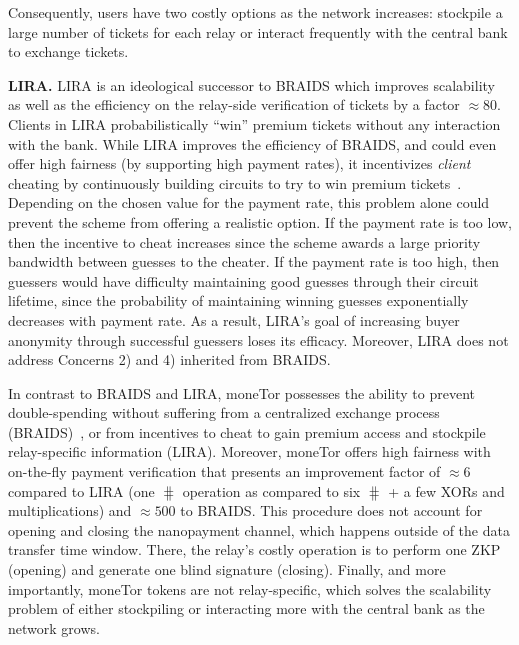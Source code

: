Consequently, users have two costly options as the network increases: stockpile a large number of tickets for each relay or interact frequently with the central bank to exchange tickets.

\medskip\noindent\textbf{LIRA.}
LIRA is an ideological successor to BRAIDS which improves scalability as well as the efficiency on the relay-side verification of tickets by a factor $\approx 80$.
Clients in LIRA probabilistically ``win'' premium tickets without any interaction with the bank.
While LIRA improves the efficiency of BRAIDS, and could even offer high fairness (by supporting high payment rates), it incentivizes \textit{client} cheating by continuously building circuits to try to win premium tickets~\cite{jansen2013lira, jansenblogpost}.
Depending on the chosen value for the payment rate, this problem alone could prevent the scheme from offering a realistic option.
If the payment rate is too low, then the incentive to cheat increases since the scheme awards a large priority bandwidth between guesses to the cheater.
If the payment rate is too high, then guessers would have difficulty maintaining good guesses through their circuit lifetime, since the probability of maintaining winning guesses exponentially decreases with payment rate.
As a result, LIRA's goal of increasing buyer anonymity through successful guessers loses its efficacy.
Moreover, LIRA does not address Concerns 2) and 4) inherited from BRAIDS.

In contrast to BRAIDS and LIRA, moneTor possesses the ability to prevent double-spending without suffering from a centralized exchange process (BRAIDS)~\cite{jansenblogpost}, or from incentives to cheat to gain premium access and stockpile relay-specific information (LIRA).
Moreover, moneTor offers high fairness with on-the-fly payment verification that presents an improvement factor of $\approx 6$ compared to LIRA (one $\hash$ operation as compared to six $\hash$ + a few XORs and multiplications) and $\approx 500$ to BRAIDS.
This procedure does not account for opening and closing the nanopayment channel, which happens outside of the data transfer time window.
There, the relay's costly operation is to perform one ZKP (opening) and generate one blind signature (closing).
Finally, and more importantly, moneTor tokens are not relay-specific, which solves the scalability problem of either stockpiling or interacting more with the central bank as the network grows.

